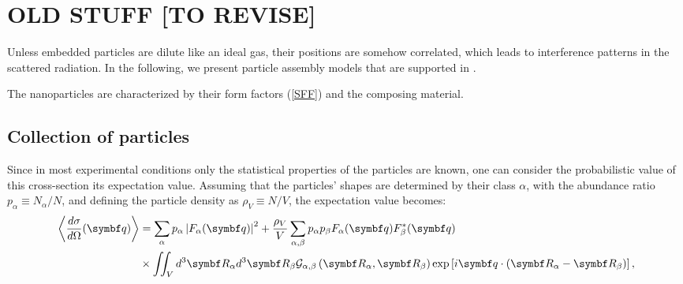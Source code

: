 \section{OLD STUFF [TO REVISE]}

Unless embedded particles are dilute like an ideal gas,
their positions are somehow correlated,
which leads to interference patterns in the scattered radiation.
In the following,
we present particle assembly models that are supported in \BornAgain.


The nanoparticles are characterized by their form factors
(\cref{SFF}) and the composing material.



\subsection{Collection of particles} \label{sec:sect:interf}

Since in most experimental conditions only the statistical properties of the particles are known, one can consider the probabilistic value of this cross-section \idest its expectation value. Assuming that the particles' shapes are determined by their class $\alpha$, with the abundance ratio $p_\alpha \equiv N_\alpha / N$, and defining the particle density as $\rho_V \equiv N/V$, the expectation value becomes:
\begin{align*}
  \bra \frac{d\sigma}{d\Omega}(\q) \ket  & = \sum_\alpha p_\alpha \left\lvert F_\alpha(\q)\right\rvert ^2 + \frac{\rho_V}{V}\sum_{\alpha,\beta} p_\alpha p_\beta F_\alpha (\q)F_\beta^*(\q)  \\
  & \times \iint_V d^3\v{R}_\alpha d^3\v{R}_\beta \ppcf{\alpha}{\beta}{R} \exp \left[ i\q\cdot (\v{R}_\alpha - \v{R}_\beta ) \right],
\end{align*}



